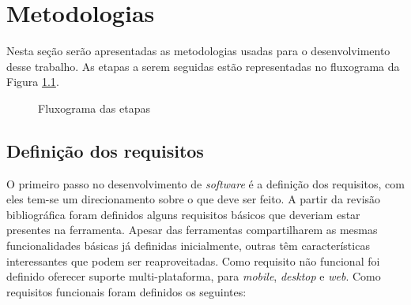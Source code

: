 \chapter{Metodologias}
\label{chap:metodologia}
Nesta seção serão apresentadas as metodologias usadas para o desenvolvimento desse trabalho. As etapas a serem seguidas estão representadas no fluxograma da Figura \ref{fig:etapas}.

\begin{figure}[ht]
  \centering
  \captionsetup{width=16cm}
  \caption{Fluxograma das etapas}
  \label{fig:etapas}
\end{figure}

\section{Definição dos requisitos}
O primeiro passo no desenvolvimento de \textit{software} é a definição dos requisitos, com eles tem-se um direcionamento sobre o que deve ser feito. A partir da revisão bibliográfica foram definidos alguns requisitos básicos que deveriam estar presentes na ferramenta. Apesar das ferramentas compartilharem as mesmas funcionalidades básicas já definidas inicialmente, outras têm características interessantes que podem ser reaproveitadas. Como requisito não funcional foi definido oferecer suporte multi-plataforma, para \textit{mobile}, \textit{desktop} e \textit{web}. Como requisitos funcionais foram definidos os seguintes:

